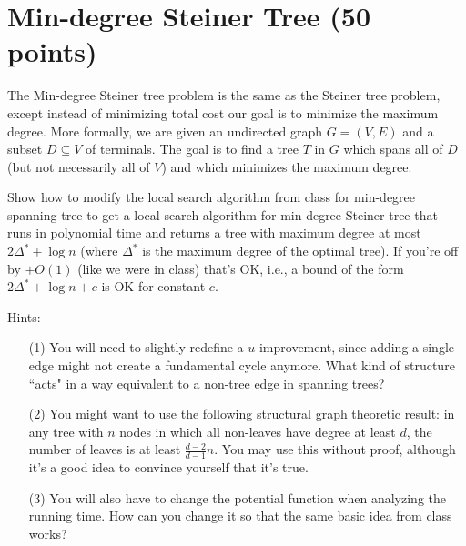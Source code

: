 \documentclass[11pt]{article}
\begin{document}
\section{Min-degree Steiner Tree (50 points)}
The Min-degree Steiner tree problem is the same as the Steiner tree problem, except instead of minimizing total cost our goal is to minimize the maximum degree.  More formally, we are given an undirected graph $G = (V,E)$ and a subset $D \subseteq V$ of terminals.  The goal is to find a tree $T$ in $G$ which spans all of $D$ (but not necessarily all of $V$) and which minimizes the maximum degree.  

Show how to modify the local search algorithm from class for min-degree spanning tree to get a local search algorithm for min-degree Steiner tree that runs in polynomial time and returns a tree with maximum degree at most $2 \Delta^* + \log n$ (where $\Delta^*$ is the maximum degree of the optimal tree).  If you're off by $+ O(1)$ (like we were in class) that's OK, i.e., a bound of the form $2 \Delta^* + \log n + c$ is OK for constant $c$.

Hints: 
\begin{enumerate}
\item[(1)] You will need to slightly redefine a $u$-improvement, since adding a single edge might not create a fundamental cycle anymore.  What kind of structure ``acts" in a way equivalent to a non-tree edge  in spanning trees?  
\item[(2)] You might want to use the following structural graph theoretic result: in any tree with $n$ nodes in which all non-leaves have degree at least $d$, the number of leaves is at least $\frac{d-2}{d-1} n$.  You may use this without proof, although it's a good idea to convince yourself that it's true.
\item[(3)] You will also have to change the potential function when analyzing the running time.  How can you change it so that the same basic idea from class works?
\end{enumerate}
\end{document}

